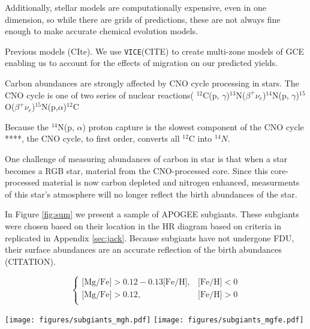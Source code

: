 \documentclass[fleqn,usenatbib]{mnras}
\newcommand{\VICE}{\texttt{VICE}}
\begin{document}
Additionally, stellar models are computationally expensive, even in one dimension, so while there are grids of predictions, these are not always fine enough to make accurate chemical evolution models. 

Previous models (CIte). We use \VICE (CITE) to create multi-zone models of GCE enabling us to account for the effects of migration on our predicted yields. 

\citet{2018MNRAS.476.3432P}
\citep{2017ApJ...837..183W}
\citep{2021MNRAS.508.4484J}
\citep{2021arXiv210603912V}


\citep[e.g.][]{2022arXiv220204666J}

Carbon abundances are strongly affected by CNO cycle processing in stars. The CNO cycle is one of two series of nuclear reactions( $^{12}$C(p, $\gamma$)$^{13}$N($\beta^+ \nu_e$)$^{14}$N(p, $\gamma$)$^{15}$O($\beta^+\nu_e$)$^{15}$N(p,$\alpha$)$^{12}$C

Because the $^{14}$N(p, $\alpha$) proton capture is the slowest component of the CNO cycle ****, the CNO cycle, to first order, converts all $^{12}$C into $^{14}N$. 

One challenge of measuring abundances of carbon in star is that when a star becomes a RGB star, material from the CNO-processed core. Since this core-processed material is now carbon depleted and nitrogen enhanced, measurments of this star's atmosphere will no longer reflect the birth abundances of the star.

In Figure \ref{fig:sum} we present a sample of APOGEE subgiants. These subgiants were chosen based on their location in the HR diagram based on criteria in \citet{jack_subgiant} replicated in Appendix \ref{sec:jack}. Because subgiants have not undergone FDU, their surface abundances are an accurate reflection of the birth abundances (CITATION).  

\begin{equation}
\begin{cases}
\text{[Mg/Fe]} >0.12-0.13\text{[Fe/H]}, & \text{[Fe/H]}<0\\
\text{[Mg/Fe]} >0.12, & \text{[Fe/H]}>0\\
\end{cases}
\end{equation}



\begin{figure*}
    \centering
    \texttt{[image: figures/subgiants\_mgh.pdf]}
    \texttt{[image: figures/subgiants\_mgfe.pdf]}
    \caption{Chemical abundance relationships of our sample of APOGEE subgiants (see Jack et al. 2023). Left panel shows }
    \label{fig:sum}
\end{figure*}
\end{document}
